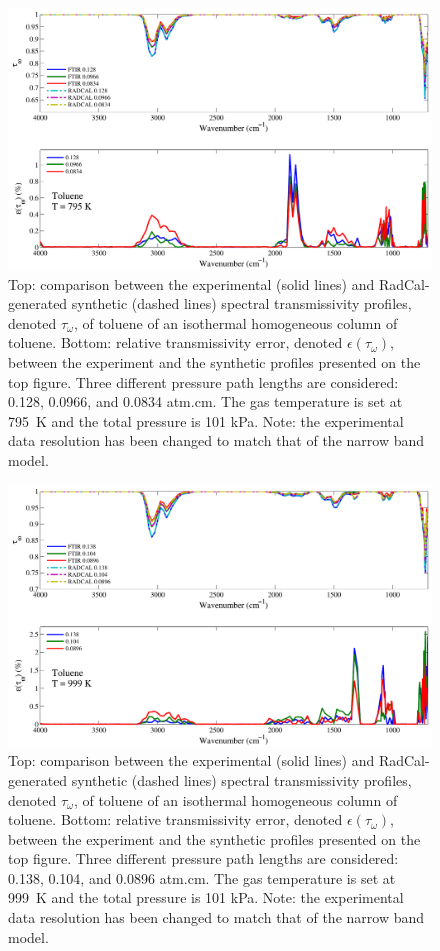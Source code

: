 \begin{figure}[p]
\includegraphics[width=\textwidth]{../Verification/Results_Test2/Toluene_795.pdf}
\caption{Top: comparison between the experimental (solid lines) and RadCal-generated synthetic (dashed lines) spectral transmissivity profiles, denoted $\tau_{\omega}$, of toluene of an isothermal homogeneous column of toluene. Bottom: relative transmissivity error, denoted $\epsilon{(\tau_{\omega})}$, between the experiment and the synthetic profiles presented on the top figure. Three different pressure path lengths are considered: 0.128, 0.0966, and 0.0834 atm.cm. The gas temperature is set at 795~K and the total pressure is 101 kPa. Note: the experimental data resolution has been changed to match that of the narrow band model. \label{fig:toluene_Verify_795K}}
\end{figure}

\begin{figure}[p]
\includegraphics[width=\textwidth]{../Verification/Results_Test2/Toluene_999.pdf}
\caption{Top: comparison between the experimental (solid lines) and RadCal-generated synthetic (dashed lines) spectral transmissivity profiles, denoted $\tau_{\omega}$, of toluene of an isothermal homogeneous column of toluene. Bottom: relative transmissivity error, denoted $\epsilon{(\tau_{\omega})}$, between the experiment and the synthetic profiles presented on the top figure. Three different pressure path lengths are considered: 0.138, 0.104, and 0.0896 atm.cm. The gas temperature is set at 999~K and the total pressure is 101 kPa. Note: the experimental data resolution has been changed to match that of the narrow band model. \label{fig:toluene_Verify_999K}}
\end{figure}


